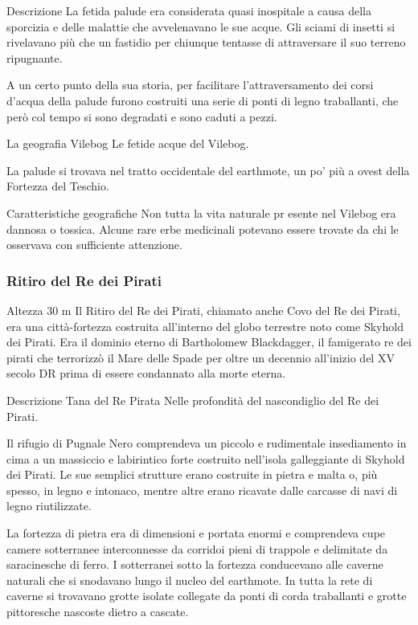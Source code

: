 \documentclass{article}
\begin{document}
Descrizione
La fetida palude era considerata quasi inospitale a causa della sporcizia e delle malattie che avvelenavano le sue acque. Gli sciami di insetti si rivelavano più che un fastidio per chiunque tentasse di attraversare il suo terreno ripugnante.

A un certo punto della sua storia, per facilitare l'attraversamento dei corsi d'acqua della palude furono costruiti una serie di ponti di legno traballanti, che però col tempo si sono degradati e sono caduti a pezzi.

La geografia
Vilebog
Le fetide acque del Vilebog.

La palude si trovava nel tratto occidentale del earthmote, un po' più a ovest della Fortezza del Teschio.

Caratteristiche geografiche
Non tutta la vita naturale pr
esente nel Vilebog era dannosa o tossica. Alcune rare erbe medicinali potevano essere trovate da chi le osservava con sufficiente attenzione.
\subsubsection{Ritiro del Re dei Pirati}
Altezza
30 m
Il Ritiro del Re dei Pirati, chiamato anche Covo del Re dei Pirati, era una città-fortezza costruita all'interno del globo terrestre noto come Skyhold dei Pirati. Era il dominio eterno di Bartholomew Blackdagger, il famigerato re dei pirati che terrorizzò il Mare delle Spade per oltre un decennio all'inizio del XV secolo DR prima di essere condannato alla morte eterna.

Descrizione
Tana del Re Pirata
Nelle profondità del nascondiglio del Re dei Pirati.

Il rifugio di Pugnale Nero comprendeva un piccolo e rudimentale insediamento in cima a un massiccio e labirintico forte costruito nell'isola galleggiante di Skyhold dei Pirati. Le sue semplici strutture erano costruite in pietra e malta o, più spesso, in legno e intonaco, mentre altre erano ricavate dalle carcasse di navi di legno riutilizzate.

La fortezza di pietra era di dimensioni e portata enormi e comprendeva cupe camere sotterranee interconnesse da corridoi pieni di trappole e delimitate da saracinesche di ferro. I sotterranei sotto la fortezza conducevano alle caverne naturali che si snodavano lungo il nucleo del earthmote. In tutta la rete di caverne si trovavano grotte isolate collegate da ponti di corda traballanti e grotte pittoresche nascoste dietro a cascate.
\end{document}
